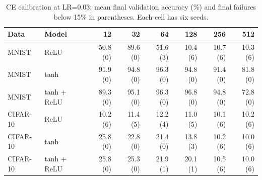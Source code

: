 \begin{table}[htbp]
\centering
\caption{CE calibration at LR=0.03: mean final validation accuracy (\%) and final failures below 15\% in parentheses. Each cell has six seeds.}
\label{tab:widthstability}
\footnotesize
\begin{tabular}{@{}llrrrrrr@{}}
\toprule
Data & Model & 12 & 32 & 64 & 128 & 256 & 512 \\
\midrule
MNIST & ReLU & 50.8 (0) & 89.6 (0) & 51.6 (3) & 10.4 (6) & 10.7 (6) & 10.3 (6) \\
MNIST & tanh & 91.9 (0) & 94.8 (0) & 96.3 (0) & 94.8 (0) & 91.4 (0) & 81.8 (0) \\
MNIST & tanh + ReLU & 89.3 (0) & 95.1 (0) & 96.3 (0) & 96.8 (0) & 94.8 (0) & 72.8 (0) \\
CIFAR-10 & ReLU & 10.2 (6) & 11.4 (5) & 12.2 (4) & 11.0 (5) & 10.1 (6) & 10.2 (6) \\
CIFAR-10 & tanh & 25.8 (0) & 22.8 (0) & 21.4 (0) & 13.8 (3) & 10.2 (6) & 10.0 (6) \\
CIFAR-10 & tanh + ReLU & 25.8 (0) & 25.3 (0) & 21.9 (1) & 20.1 (1) & 10.5 (6) & 10.0 (6) \\
\bottomrule
\end{tabular}
\par{}
\end{table}
